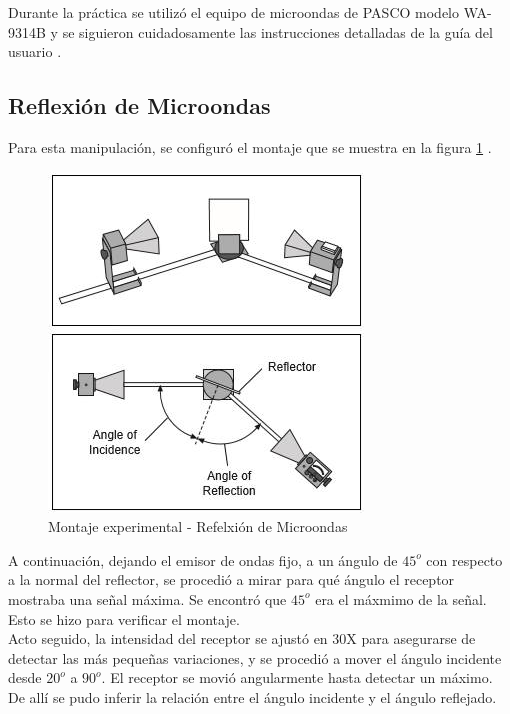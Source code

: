 \documentclass[%
 reprint,
 amsmath,amssymb,
 aps,
]{revtex4-1}
\begin{document}
Durante la práctica se utilizó el equipo de microondas de PASCO modelo WA-9314B y se siguieron cuidadosamente las instrucciones detalladas de la guía del usuario \cite{guia}.\\

\subsection{\label{sec:level2}Reflexión de Microondas}
Para esta manipulación, se configuró el montaje que se muestra en la figura \ref{fig:reflexion} .\\

\begin{figure}[h!]
\centering
\includegraphics[width=0.7\linewidth]{Pictures/reflexion}
\caption{Montaje experimental - Refelxión de Microondas}
\label{fig:reflexion}
\end{figure}

A continuación, dejando el emisor de ondas fijo, a un ángulo de $45^o$ con respecto a la normal del reflector, se procedió a mirar para qué ángulo el receptor mostraba una señal máxima. Se encontró que $45^o$ era el máxmimo de la señal. Esto se hizo para verificar el montaje. \\

Acto seguido, la intensidad del receptor se ajustó en 30X para asegurarse de detectar las más pequeñas variaciones, y se procedió a mover el ángulo incidente desde $20^o$ a $90^o$. El receptor se movió angularmente hasta detectar un máximo. De allí se pudo inferir la relación entre el ángulo incidente y el ángulo reflejado.  \\
\end{document}
